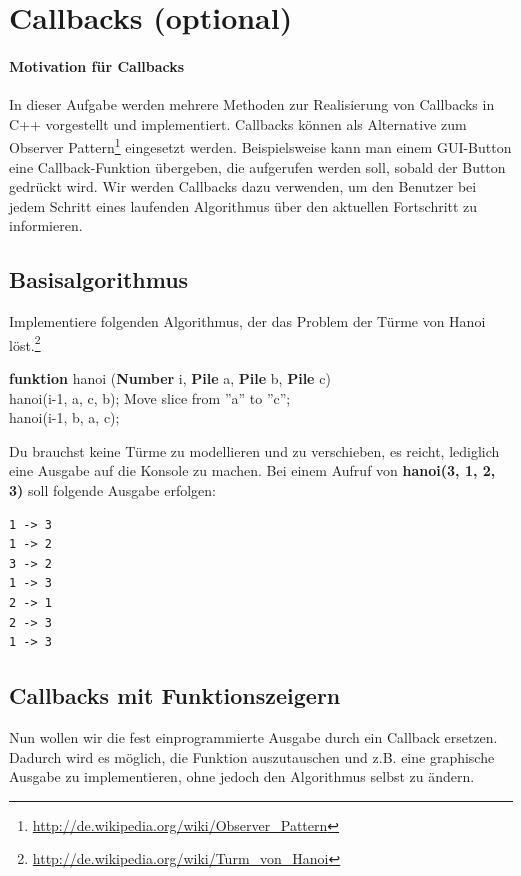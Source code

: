 \section{Callbacks (optional)}

\paragraph*{Motivation für Callbacks}
In dieser Aufgabe werden mehrere Methoden zur Realisierung von Callbacks in C++ vorgestellt und implementiert.
Callbacks können als Alternative zum Observer Pattern\footnote{\url{http://de.wikipedia.org/wiki/Observer_Pattern}} eingesetzt werden.
Beispielsweise kann man einem GUI-Button eine Callback-Funktion übergeben, die aufgerufen werden soll, sobald der Button gedrückt wird.
Wir werden Callbacks dazu verwenden, um den Benutzer bei jedem Schritt eines laufenden Algorithmus über den aktuellen Fortschritt zu informieren.

\subsection{Basisalgorithmus}
Implementiere folgenden Algorithmus, der das Problem der Türme von Hanoi löst.\footnote{\url{http://de.wikipedia.org/wiki/Turm_von_Hanoi}}\\
\begin{algorithm}[H]
 \SetAlgoLined
 \textbf{funktion} hanoi (\textbf{Number} i, \textbf{Pile} a, \textbf{Pile} b, \textbf{Pile} c) { \\
      {
        hanoi(i-1, a, c, b); 
        Move slice from ''a'' to ''c''; \\
        hanoi(i-1, b, a, c); 
     }
 }
\end{algorithm}

Du brauchst keine Türme zu modellieren und zu verschieben, es reicht, lediglich eine Ausgabe auf die Konsole zu machen. Bei einem Aufruf von \textbf{hanoi(3, 1, 2, 3)} soll folgende Ausgabe erfolgen:
\begin{lstlisting}
1 -> 3
1 -> 2
3 -> 2
1 -> 3
2 -> 1
2 -> 3
1 -> 3
\end{lstlisting}

\subsection{Callbacks mit Funktionszeigern}
Nun wollen wir die fest einprogrammierte Ausgabe durch ein Callback ersetzen. Dadurch wird es möglich, die Funktion auszutauschen und z.B. eine graphische Ausgabe zu implementieren, ohne jedoch den Algorithmus selbst zu ändern.

